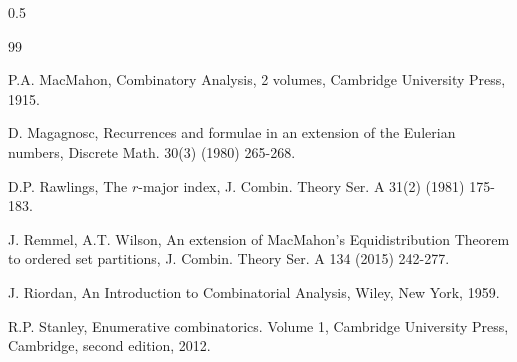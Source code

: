 \documentclass[12pt]{article}
\begin{document}
\begin{spacing}{0.5}
\begin{thebibliography}{99}
{			
			P.A. MacMahon, Combinatory Analysis, 2 volumes, Cambridge University Press, 1915.
			
			 D. Magagnosc,
			Recurrences and formulae in an extension of the Eulerian numbers,
			Discrete Math. 30(3) (1980) 265-268.
			
			 D.P. Rawlings,
			The $r$-major index, J. Combin. Theory Ser. A 31(2) (1981) 175-183.
			
			J. Remmel, A.T. Wilson, 
			An extension of MacMahon's Equidistribution Theorem to ordered set partitions, 
			J. Combin. Theory Ser. A 134 (2015) 242-277.
			
			 J. Riordan,
			An Introduction to Combinatorial Analysis, Wiley, New York, 1959.
			
			 R.P. Stanley,  
			Enumerative combinatorics. Volume 1,
			Cambridge University Press, Cambridge, second edition, 2012.
		}
	\end{thebibliography}
\end{spacing}
\end{document}
